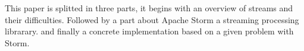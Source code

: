 This paper is splitted in three parts, it begins with an overview of streams and their difficulties.
Followed by a part about Apache Storm a streaming processing librarary.
and finally a concrete implementation based on a given problem with Storm.